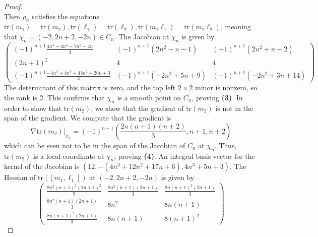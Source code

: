 \documentclass{article}
\theoremstyle{plain}
\theoremstyle{definition}
\theoremstyle{plain}
\theoremstyle{plain}
\theoremstyle{plain}
\theoremstyle{remark}
\theoremstyle{remark}
\theoremstyle{plain}
\theoremstyle{plain}
\begin{document}
\begin{proof}
\begin{equation}
\end{equation}
Then $\rho_n$ satisfies the equations $\text{tr}(m_1) = \text{tr}(m_2), \text{tr}(\ell_1) = \text{tr}(\ell_2), \text{tr}(m_1\ell_1) = \text{tr}(m_2\ell_2)$, meaning that $\chi_n = (-2, 2n+2, -2n) \in C_n$. The Jacobian at $\chi_n$ is given by 
\begin{equation}
	\begin{pmatrix}(-1)^{n+1}\frac{4n^4 + 4n^3 - 7n^2 - 4n}{3} & (-1)^{n+1}(2n^2 - n - 1) & (-1)^{n+1}(2n^2 + n - 2) \\ (2n+1)^2 & 4 & 4 \\ (-1)^{n+1}\frac{-4n^4 + 4n^3 + 43n^2 + 26n + 3}{3} & (-1)^{n+1}(-2n^2 + 5n + 9) & (-1)^{n+1}(-2n^2 + 3n + 14) \end{pmatrix}
\end{equation}
The determinant of this matrix is zero, and the top left $2 \times 2$ minor is nonzero, so the rank is 2. This confirms that $\chi_n$ is a smooth point on $C_n$, proving \textbf{(3)}. In order to show that $\text{tr}(m_2)$, we show that the gradient of $\text{tr}(m_2)$ is not in the span of the gradient. We compute that the gradient is 
\begin{equation}
	\nabla \text{tr}(m_2)|_{\chi_n} = (-1)^{n+1}\left(\frac{2n(n+1)(n+2)}{3}, n+1, n+2\right)
\end{equation}
which can be seen not to be in the span of the Jacobian of $C_n$ at $\chi_n$. Thus, $\text{tr}(m_2)$ is a local coordinate at $\chi_n$, proving \textbf{(4)}. An integral basis vector for the kernel of the Jacobian is $(12, -(4n^3 + 12n^2 + 17n + 6), 4n^3 + 5n + 3)$. The Hessian of $\text{tr}([m_1, \ell_1])$ at $(-2, 2n+2, -2n)$ is given by 
\begin{equation}
	\begin{pmatrix}\frac{8n^2(n+1)^2(2n+1)^2}{9} & \frac{8n^2(n+1)(2n+1)}{3} & \frac{8n(n+1)^2(2n+1)}{3} \\ \frac{8n^2(n+1)(2n+1)}{3} & 8n^2 & 8n(n+1) \\ \frac{8n(n+1)^2(2n+1)}{3} & 8n(n+1) & 8(n+1)^2\end{pmatrix}
\end{equation}

\end{proof}
\end{document}
